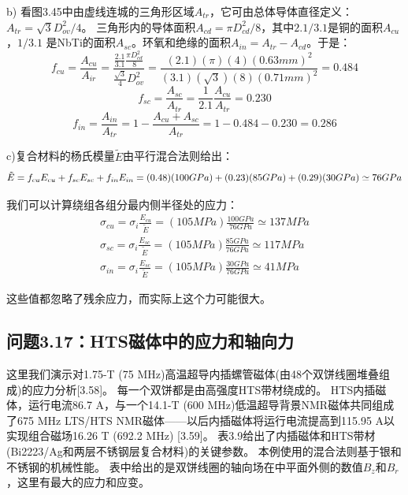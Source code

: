 b) 看图3.45中由虚线连城的三角形区域$A_{tr}$，它可由总体导体直径定义：$A_{tr} =\sqrt{3} D_{ov}^2/4$。
三角形内的导体面积$A_{cd}= \pi D_{cd}^2/8$，其中$2.1/3.1$是铜的面积$A_{cu}$，$1/3.1$
是NbTi的面积$A_{sc}$。环氧和绝缘的面积$A_{in}= A_{tr} − A_{cd}$。于是：
\begin{equation}
f_{cu}=\frac{A_{cu}}{A_{ir}}=\frac{\frac{2.1}{3.1}\frac{\pi D_{cd}^{2}}{8}}{\frac{\sqrt{3}}{4}D_{ov}^{2}}=\frac{(2.1)(\pi)(4)(0.63mm)^{2}}{(3.1)(\sqrt{3})(8)(0.71mm)^{2}}=0.484%
\end{equation}
\begin{equation}
f_{sc}=\frac{A_{sc}}{A_{tr}}=\frac{1}{2.1}\frac{A_{cu}}{A_{tr}}=0.230 %
\end{equation}
\begin{equation}
f_{in}=\frac{A_{in}}{A_{tr}}=1-\frac{A_{cu}+A_{sc}}{A_{tr}}=1-0.484-0.230=0.286 %
\end{equation}

c)复合材料的杨氏模量$\tilde{E}$由平行混合法则给出：
\begin{equation}
\tilde{E}=f_{cu}E_{cu}+f_{sc}E_{sc}+f_{in}E_{in}\\%
=(0.48)(100 GPa)+(0.23)(85 GPa)+(0.29)(30 GPa)\\
\simeq 76 GPa
\end{equation}

我们可以计算绕组各组分最内侧半径处的应力：
\begin{eqnarray}
\sigma_{cu}=\sigma_{i}\frac{E_{cu}}{\tilde{E}}=(105MPa)\frac{100GPa}{76GPa}\simeq 137MPa \\%
\sigma_{sc}=\sigma_{i}\frac{E_{sc}}{\tilde{E}}=(105MPa)\frac{85GPa}{76GPa}\simeq 117MPa \\%
\sigma_{in}=\sigma_{i}\frac{E_{sc}}{\tilde{E}}=(105MPa)\frac{30GPa}{76GPa}\simeq 41MPa %
\end{eqnarray}

这些值都忽略了残余应力，而实际上这个力可能很大。
\newpage


\subsection{问题3.17：HTS磁体中的应力和轴向力}
这里我们演示对1.75-T (75 MHz)高温超导内插螺管磁体(由48个双饼线圈堆叠组成)的应力分析[3.58]。
每一个双饼都是由高强度HTS带材绕成的。
HTS内插磁体，运行电流86.7 A，与一个14.1-T (600 MHz)低温超导背景NMR磁体共同组成了675 MHz LTS/HTS
NMR磁体——以后内插磁体将运行电流提高到115.95 A以实现组合磁场16.26 T (692.2 MHz) [3.59]。
表3.9给出了内插磁体和HTS带材(Bi2223/Ag和两层不锈钢层复合材料)的关键参数。 
本例使用的混合法则基于银和不锈钢的机械性能。
表中给出的是双饼线圈的轴向场在中平面外侧的数值$B_z$和$B_r$，这里有最大的应力和应变。

